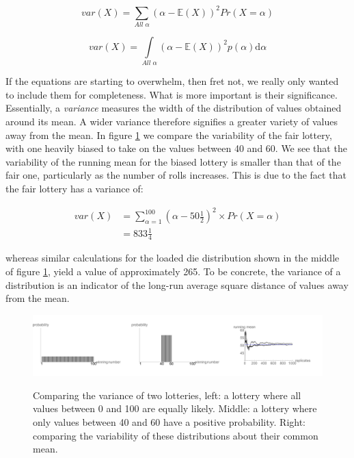 \documentclass[11pt,fullpage]{book}
\begin{document}
\begin{equation}\label{eq:Probability_varianceDistributionDiscrete}
var(X) = \sum\limits_{All\; \alpha} (\alpha-\mathbb{E}(X))^2 Pr(X=\alpha)
\end{equation}

\begin{equation}\label{eq:Probability_varianceDistributionContinuous}
var(X) = \int\limits_{All\; \alpha} (\alpha-\mathbb{E}(X))^2 p(\alpha)\mathrm{d}\alpha
\end{equation}

If the equations are starting to overwhelm, then fret not, we really only wanted to include them for completeness. What is more important is their significance. Essentially, a \textit{variance} measures the width of the distribution of values obtained around its mean. A wider variance therefore signifies a greater variety of values away from the mean. In figure \ref{fig:Probability_varianceLottery} we compare the variability of the fair lottery, with one heavily biased to take on the values between 40 and 60. We see that the variability of the running mean for the biased lottery is smaller than that of the fair one, particularly as the number of rolls increases. This is due to the fact that the fair lottery has a variance of:

\begin{align}
var(X) &= \sum\limits_{\alpha=1}^{100} (\alpha-50\tfrac{1}{2})^2\times Pr(X=\alpha)\\
&= 833\tfrac{1}{4}
\end{align}

whereas similar calculations for the loaded die distribution shown in the middle of figure \ref{fig:Probability_varianceLottery}, yield a value of approximately 265. To be concrete, the variance of a distribution is an indicator of the long-run average square distance of values away from the mean. 

\begin{figure}
\centering
\scalebox{0.35} 
{\includegraphics{Probability_varianceLottery.pdf}}
\caption{Comparing the variance of two lotteries, left: a lottery where all values between 0 and 100 are equally likely. Middle: a lottery where only values between 40 and 60 have a positive probability. Right: comparing the variability of these distributions about their common mean.}\label{fig:Probability_varianceLottery}
\end{figure} 
\end{document}

